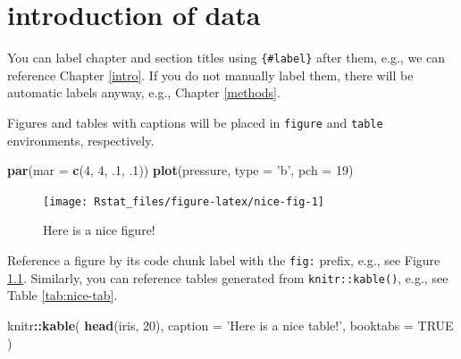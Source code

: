 \documentclass[]{book}
\newenvironment{Shaded}{\begin{snugshade}}{\end{snugshade}}
\newcommand{\KeywordTok}[1]{\textcolor[rgb]{0.13,0.29,0.53}{\textbf{#1}}}
\newcommand{\DataTypeTok}[1]{\textcolor[rgb]{0.13,0.29,0.53}{#1}}
\newcommand{\DecValTok}[1]{\textcolor[rgb]{0.00,0.00,0.81}{#1}}
\newcommand{\FloatTok}[1]{\textcolor[rgb]{0.00,0.00,0.81}{#1}}
\newcommand{\StringTok}[1]{\textcolor[rgb]{0.31,0.60,0.02}{#1}}
\newcommand{\OtherTok}[1]{\textcolor[rgb]{0.56,0.35,0.01}{#1}}
\newcommand{\OperatorTok}[1]{\textcolor[rgb]{0.81,0.36,0.00}{\textbf{#1}}}
\newcommand{\NormalTok}[1]{#1}
\begin{document}
\hypertarget{introduction-of-data}{%
\chapter{introduction of data}\label{introduction-of-data}}

You can label chapter and section titles using \texttt{\{\#label\}} after them, e.g., we can reference Chapter \ref{intro}. If you do not manually label them, there will be automatic labels anyway, e.g., Chapter \ref{methods}.

Figures and tables with captions will be placed in \texttt{figure} and \texttt{table} environments, respectively.

\begin{Shaded}
\begin{Highlighting}[]
\KeywordTok{par}\NormalTok{(}\DataTypeTok{mar =} \KeywordTok{c}\NormalTok{(}\DecValTok{4}\NormalTok{, }\DecValTok{4}\NormalTok{, }\FloatTok{.1}\NormalTok{, }\FloatTok{.1}\NormalTok{))}
\KeywordTok{plot}\NormalTok{(pressure, }\DataTypeTok{type =} \StringTok{'b'}\NormalTok{, }\DataTypeTok{pch =} \DecValTok{19}\NormalTok{)}
\end{Highlighting}
\end{Shaded}

\begin{figure}

{\centering \texttt{[image: Rstat\_files/figure-latex/nice-fig-1]} 

}

\caption{Here is a nice figure!}\label{fig:nice-fig}
\end{figure}

Reference a figure by its code chunk label with the \texttt{fig:} prefix, e.g., see Figure \ref{fig:nice-fig}. Similarly, you can reference tables generated from \texttt{knitr::kable()}, e.g., see Table \ref{tab:nice-tab}.

\begin{Shaded}
\begin{Highlighting}[]
\NormalTok{knitr}\OperatorTok{::}\KeywordTok{kable}\NormalTok{(}
  \KeywordTok{head}\NormalTok{(iris, }\DecValTok{20}\NormalTok{), }\DataTypeTok{caption =} \StringTok{'Here is a nice table!'}\NormalTok{,}
  \DataTypeTok{booktabs =} \OtherTok{TRUE}
\NormalTok{)}
\end{Highlighting}
\end{Shaded}
\end{document}
